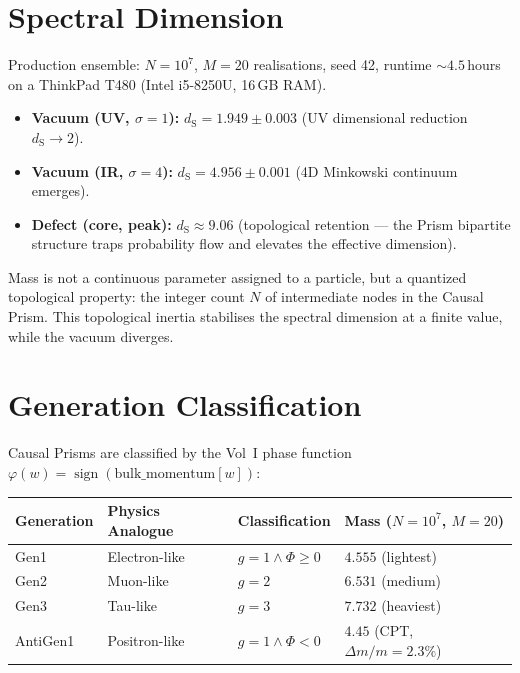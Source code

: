 \documentclass[11pt, a4paper, openany]{book}
\newcommand{\dS}{d_{\mathrm{S}}}
\begin{document}
\section{Spectral Dimension}

Production ensemble: $N = 10^7$, $M = 20$ realisations, seed 42, runtime ${\sim}4.5$\,hours on a ThinkPad T480 (Intel i5-8250U, 16\,GB RAM).

\begin{itemize}
  \item \textbf{Vacuum (UV, $\sigma{=}1$):} $\dS = 1.949 \pm 0.003$
        (UV dimensional reduction $\dS \to 2$).
  \item \textbf{Vacuum (IR, $\sigma{=}4$):} $\dS = 4.956 \pm 0.001$
        (4D Minkowski continuum emerges).
  \item \textbf{Defect (core, peak):} $\dS \approx 9.06$
        (topological retention --- the Prism bipartite structure traps probability
        flow and elevates the effective dimension).
\end{itemize}

\begin{result}
Mass is not a continuous parameter assigned to a particle, but a quantized
topological property: the integer count $N$ of intermediate nodes in the Causal
Prism.  This topological inertia stabilises the spectral dimension at a finite
value, while the vacuum diverges.
\end{result}

\section{Generation Classification}

Causal Prisms are classified by the Vol~I phase function
$\varphi(w) = \operatorname{sign}(\text{bulk\_momentum}[w])$:

\begin{table}[H]
\centering
\begin{tabular}{@{} l l l l @{}}
\toprule
\textbf{Generation} & \textbf{Physics Analogue} & \textbf{Classification} & \textbf{Mass ($N{=}10^7$, $M{=}20$)} \\
\midrule
Gen1     & Electron-like  & $g{=}1 \wedge \Phi{\ge}0$ & $4.555$ (lightest) \\
Gen2     & Muon-like      & $g{=}2$                   & $6.531$ (medium) \\
Gen3     & Tau-like       & $g{=}3$                   & $7.732$ (heaviest) \\
AntiGen1 & Positron-like  & $g{=}1 \wedge \Phi{<}0$   & $4.45$ (CPT, $\Delta m/m = 2.3\%$) \\
\bottomrule
\end{tabular}
\end{table}
\end{document}
